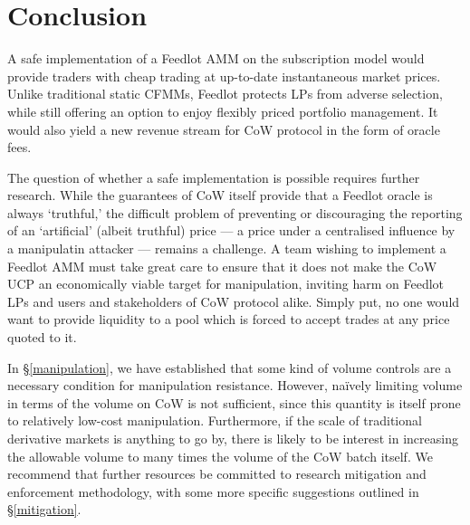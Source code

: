 \documentclass[a4paper,10pt]{article}
\theoremstyle{remark}
\begin{document}

\section{Conclusion}

A safe implementation of a Feedlot AMM on the subscription model would provide traders with cheap trading at up-to-date instantaneous market prices.
%
Unlike traditional static CFMMs, Feedlot protects LPs from adverse selection, while still offering an option to enjoy flexibly priced portfolio management. 
%
It would also yield a new revenue stream for CoW protocol in the form of oracle fees.

The question of whether a safe implementation is possible requires further research.
%
While the guarantees of CoW itself provide that a Feedlot oracle is always `truthful,' the difficult problem of preventing or discouraging the reporting of an `artificial' (albeit truthful) price --- a price under a centralised influence by a manipulatin attacker --- remains a challenge. 
%
A team wishing to implement a Feedlot AMM must take great care to ensure that it does not make the CoW UCP an economically viable target for manipulation, inviting harm on Feedlot LPs and users and stakeholders of CoW protocol alike.
%
Simply put, no one would want to provide liquidity to a pool which is forced to accept trades at any price quoted to it.

In \S\ref{manipulation}, we have established that some kind of volume controls are a necessary condition for manipulation resistance.
%
However, na\"ively limiting volume in terms of the volume on CoW is not sufficient, since this quantity is itself prone to relatively low-cost manipulation.
%
Furthermore, if the scale of traditional derivative markets is anything to go by, there is likely to be interest in increasing the allowable volume to many times the volume of the CoW batch itself.
%
We recommend that further resources be committed to research mitigation and enforcement methodology, with some more specific suggestions outlined in \S\ref{mitigation}.


\printbibliography
\end{document}
